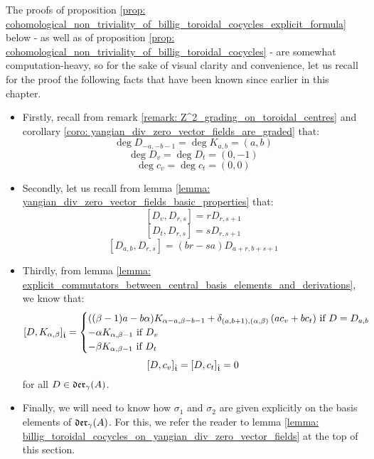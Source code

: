         \begin{remark}
            The proofs of proposition \ref{prop: cohomological_non_triviality_of_billig_toroidal_cocycles_explicit_formula} below - as well as of proposition \ref{prop: cohomological_non_triviality_of_billig_toroidal_cocycles} - are somewhat computation-heavy, so for the sake of visual clarity and convenience, let us recall for the proof the following facts that have been known since earlier in this chapter.
            \begin{itemize}
                \item Firstly, recall from remark \ref{remark: Z^2_grading_on_toroidal_centres} and corollary \ref{coro: yangian_div_zero_vector_fields_are_graded} that:
                    $$\deg D_{-a, -b - 1} = \deg K_{a, b} = (a, b)$$
                    $$\deg D_v = \deg D_t = (0, -1)$$
                    $$\deg c_v = \deg c_t = (0, 0)$$
                \item Secondly, let us recall from lemma \ref{lemma: yangian_div_zero_vector_fields_basic_properties} that:
                    $$[D_v, D_{r, s}] = r D_{r, s + 1}$$
                    $$[D_t, D_{r, s}] = s D_{r, s + 1}$$
                    $$[D_{a, b}, D_{r, s}] = (br - sa) D_{a + r, b + s + 1}$$
                \item Thirdly, from lemma \ref{lemma: explicit_commutators_between_central_basis_elements_and_derivations}, we know that:
                    $$[D, K_{\alpha, \beta}]_{\hat{\mathfrak{t}}} =
                        \begin{cases}
                            \text{$((\beta - 1)a - b\alpha) K_{\alpha - a, \beta - b - 1} + \delta_{(a, b + 1), (\alpha, \beta)} \left( a c_v + b c_t \right)$ if $D = D_{a, b}$}
                            \\
                            \text{$-\alpha K_{\alpha, \beta - 1}$ if $D_v$}
                            \\
                            \text{$-\beta K_{\alpha, \beta - 1}$ if $D_t$}
                        \end{cases}
                    $$
                    $$[D, c_v]_{\hat{\mathfrak{t}}} = [D, c_t]_{\hat{\mathfrak{t}}} = 0$$
                for all $D \in \mathfrak{der}_{\gamma}(A)$.
                \item Finally, we will need to know how $\sigma_1$ and $\sigma_2$ are given explicitly on the basis elements of $\mathfrak{der}_{\gamma}(A)$. For this, we refer the reader to lemma \ref{lemma: billig_toroidal_cocycles_on_yangian_div_zero_vector_fields} at the top of this section.
            \end{itemize}
        \end{remark}

